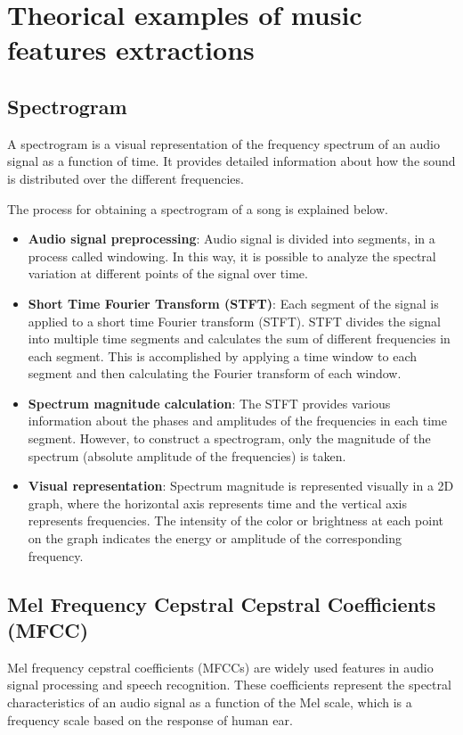 \section{Theorical examples of music features extractions}

\subsection{Spectrogram}
A spectrogram is a visual representation of the frequency spectrum of an audio signal as a function of time. It provides detailed information about how the sound is distributed over the different frequencies.

The process for obtaining a spectrogram of a song is explained below.

\begin{itemize}
\item \textbf{Audio signal preprocessing}: Audio signal is divided into segments, in a process called windowing. In this way, it is possible to analyze the spectral variation at different points of the signal over time.

\item \textbf{Short Time Fourier Transform (STFT)}: Each segment of the signal is applied to a short time Fourier transform (STFT). STFT divides the signal into multiple time segments and calculates the sum of different frequencies in each segment.  
This is accomplished by applying a time window to each segment and then calculating the Fourier transform of each window.

\item \textbf{Spectrum magnitude calculation}: The STFT provides various information about the phases and amplitudes of the frequencies in each time segment. However, to construct a spectrogram, only the magnitude of the spectrum (absolute amplitude of the frequencies) is taken.

\item \textbf{Visual representation}: Spectrum magnitude is represented visually in a 2D graph, where the horizontal axis represents time and the vertical axis represents frequencies. The intensity of the color or brightness at each point on the graph indicates the energy or amplitude of the corresponding frequency.
\end{itemize}


\subsection{Mel Frequency Cepstral Cepstral Coefficients (MFCC)}
Mel frequency cepstral coefficients (MFCCs) are widely used features in audio signal processing and speech recognition. 
These coefficients represent the spectral characteristics of an audio signal as a function of the Mel scale, which is a frequency scale based on the response of human ear.

